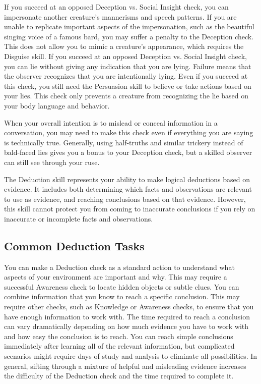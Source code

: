          If you succeed at an opposed Deception vs. Social Insight check, you can impersonate another creature's mannerisms and speech patterns.
        If you are unable to replicate important aspects of the impersonation, such as the beautiful singing voice of a famous bard, you may suffer a penalty to the Deception check.
        This does not allow you to mimic a creature's appearance, which requires the Disguise skill.
         If you succeed at an opposed Deception vs. Social Insight check, you can lie without giving any indication that you are lying.
        Failure means that the observer recognizes that you are intentionally lying.
        Even if you succeed at this check, you still need the Persuasion skill to believe or take actions based on your lies.
        This check only prevents a creature from recognizing the lie based on your body language and behavior.

        When your overall intention is to mislead or conceal information in a conversation, you may need to make this check even if everything you are saying is technically true.
        Generally, using half-truths and similar trickery instead of bald-faced lies gives you a bonus to your Deception check, but a skilled observer can still see through your ruse.


\newpage
{}
    The Deduction skill represents your ability to make logical deductions based on evidence.
    It includes both determining which facts and observations are relevant to use as evidence, and reaching conclusions based on that evidence.
    However, this skill cannot protect you from coming to inaccurate conclusions if you rely on inaccurate or incomplete facts and observations.

    \subsection{Common Deduction Tasks}
         You can make a Deduction check as a standard action to understand what aspects of your environment are important and why.
        This may require a successful Awareness check to locate hidden objects or subtle clues.
         You can combine information that you know to reach a specific conclusion.
        This may require other checks, such as Knowledge or Awareness checks, to ensure that you have enough information to work with.
        The time required to reach a conclusion can vary dramatically depending on how much evidence you have to work with and how easy the conclusion is to reach.
        You can reach simple conclusions immediately after learning all of the relevant information, but complicated scenarios might require days of study and analysis to eliminate all possibilities.
        In general, sifting through a mixture of helpful and misleading evidence increases the difficulty of the Deduction check and the time required to complete it.


